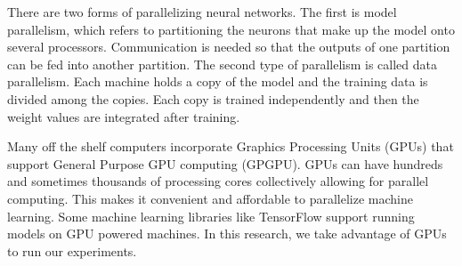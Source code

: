 There are two forms of parallelizing neural networks. The first is model parallelism, which refers to partitioning the neurons that make up the model onto several processors. Communication is needed so that the outputs of one partition can be fed into another partition. The second type of parallelism is called data parallelism. Each machine holds a copy of the model and the training data is divided among the copies. Each copy is trained independently and then the weight values are integrated after training\cite{Le15atutorial2}.

Many off the shelf computers incorporate Graphics Processing Units (GPUs) that support General Purpose GPU computing (GPGPU). GPUs can have hundreds and sometimes thousands of processing cores collectively allowing for parallel computing. This makes it convenient and affordable to parallelize machine learning. Some machine learning libraries like TensorFlow support running models on GPU powered machines. In this research, we take advantage of GPUs to run our experiments.